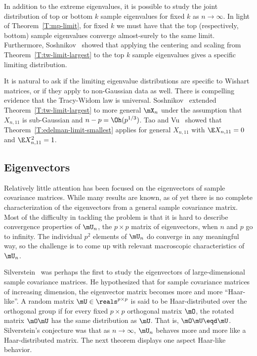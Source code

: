 In addition to the extreme eigenvalues, it is possible to study the joint distribution of top or bottom $k$ sample eigenvalues for fixed $k$ as
$n \to \infty$.  In light of Theorem~\ref{T:mp-limit}, for fixed $k$ we must have that the top (respectively, bottom) sample eigenvalues converge almost-surely to the same limit.  Furthermore, Soshnikov~\cite{soshnikov2002nud} showed that applying the centering and scaling from Theorem~\ref{T:tw-limit-largest} to the top $k$ sample eigenvalues gives a specific limiting distribution.

It is natural to ask if the limiting eigenvalue distributions are specific to Wishart matrices, or if they apply to non-Gaussian data as well.  There is compelling evidence that the Tracy-Widom law is universal.   Soshnikov~\cite{soshnikov2002nud} extended Theorem~\ref{T:tw-limit-largest} to more general $\mX_n$ under the assumption that $X_{n,11}$ is sub-Gaussian and $n-p = \Oh(p^{1/3})$.  Tao and Vu~\cite{tao2009rmd} showed that Theorem~\ref{T:edelman-limit-smallest} applies for general $X_{n,11}$ with $\E X_{n,11} = 0$ and $\E X_{n,11}^2 = 1$.


\subsection{Eigenvectors}

Relatively little attention has been focused on the eigenvectors of sample covariance matrices.  While many results are known, as of yet there is no complete characterization of the eigenvectors from a general sample covariance matrix.  Most of the difficulty in tackling the problem is that it is hard to describe convergence properties of $\mU_n$, the $p\times p$ matrix of eigenvectors, when $n$ and $p$ go to infinity.  The individual $p^2$ elements of $\mU_n$ do converge in any meaningful way, so the challenge is to come up with relevant macroscopic characteristics of $\mU_n$.

Silverstein~\cite{silverstein1979reg} was perhaps the first to study the eigenvectors of large-dimensional sample covariance matrices.  He hypothesized that for sample covariance matrices of increasing dimension, the eigenvector matrix becomes more and more ``Haar-like''.  A random matrix $\mU \in \reals^{p\times p}$ is said to be Haar-distributed over the orthogonal group if for every fixed $p \times p$ orthogonal matrix $\mO$, the rotated matrix $\mO \mU$ has the same distribution as $\mU$.  That is, $\mO \mU \eqd \mU$.  Silverstein's conjecture was that as $n \to \infty$, $\mU_n$ behaves more and more like a Haar-distributed matrix.  The next theorem displays one aspect Haar-like behavior.

